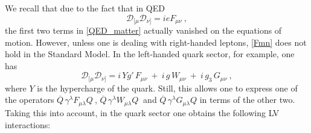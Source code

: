\documentclass[12pt]{revtex4}
\newcommand{\ov}{\overline}
\begin{document}
	We recall that due to the fact that in QED
\begin{equation}
\label{Fmn}
	\mathcal{D}_{[\mu}\mathcal{D}_{\nu]} = i e F_{\mu\nu}~, 
\end{equation} 
	the first two terms in \eqref{QED_matter} actually vanished on 
	the equations of motion.
	However, unless one is dealing with right-handed leptons, 
	\eqref{Fmn} does not hold in the Standard Model.
	In the left-handed quark sector, for example, one has
\begin{equation}
\label{FmnQCD}
	\mathcal{D}_{[\mu}\mathcal{D}_{\nu]} = 
	i\, Y g'\, F_{\mu\nu} ~+~ 
	i\, g\, W_{\mu\nu} ~+~
	i\, g_3\, G_{\mu\nu}~,
\end{equation}
	where $ Y $ is the hypercharge of the quark.
	Still, this allows one to express one of the operators 
$ \ov{Q}\, \gamma^\lambda F_{\mu\lambda} Q~ $,
$ \ov{Q}\, \gamma^\lambda W_{\mu\lambda} Q~ $ and
$ \ov{Q}\, \gamma^\lambda G_{\mu\lambda} Q $
	in terms of the other two.
	Taking this into account, 
	in the quark sector 
	one obtains the following LV interactions:
\end{document}
